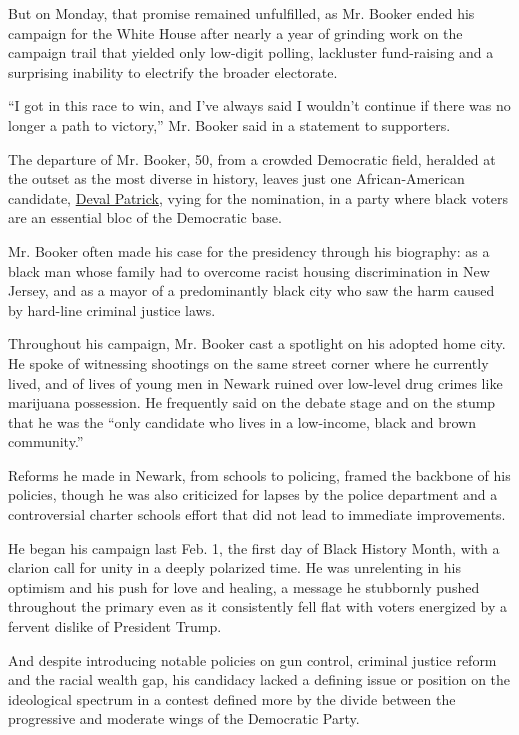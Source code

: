 But on Monday, that promise remained unfulfilled, as Mr. Booker ended
his campaign for the White House after nearly a year of grinding work on
the campaign trail that yielded only low-digit polling, lackluster
fund-raising and a surprising inability to electrify the broader
electorate.

``I got in this race to win, and I've always said I wouldn't continue if
there was no longer a path to victory,'' Mr. Booker said in a statement
to supporters.

The departure of Mr. Booker, 50, from a crowded Democratic field,
heralded at the outset as the most diverse in history, leaves just one
African-American candidate,
\href{https://www.nytimes3xbfgragh.onion/interactive/2020/us/elections/deval-patrick.html}{Deval
Patrick}, vying for the nomination, in a party where black voters are an
essential bloc of the Democratic base.

Mr. Booker often made his case for the presidency through his biography:
as a black man whose family had to overcome racist housing
discrimination in New Jersey, and as a mayor of a predominantly black
city who saw the harm caused by hard-line criminal justice laws.

Throughout his campaign, Mr. Booker cast a spotlight on his adopted home
city. He spoke of witnessing shootings on the same street corner where
he currently lived, and of lives of young men in Newark ruined over
low-level drug crimes like marijuana possession. He frequently said on
the debate stage and on the stump that he was the ``only candidate who
lives in a low-income, black and brown community.''

Reforms he made in Newark, from schools to policing, framed the backbone
of his policies, though he was also criticized for lapses by the police
department and a controversial charter schools effort that did not lead
to immediate improvements.

He began his campaign last Feb. 1, the first day of Black History Month,
with a clarion call for unity in a deeply polarized time. He was
unrelenting in his optimism and his push for love and healing, a message
he stubbornly pushed throughout the primary even as it consistently fell
flat with voters energized by a fervent dislike of President Trump.

And despite introducing notable policies on gun control, criminal
justice reform and the racial wealth gap, his candidacy lacked a
defining issue or position on the ideological spectrum in a contest
defined more by the divide between the progressive and moderate wings of
the Democratic Party.

